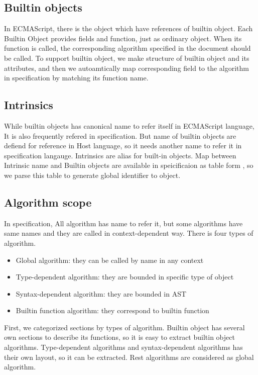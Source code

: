 \subsection{Builtin objects}

 In ECMAScript, there is the object which have references of builtin object. Each Builtin Object provides fields and function, just as ordinary object. When its function is called,
 the corresponding algorithm specified in the document should be called. To support builtin object, we make structure of builtin object and its attributes, and then we autoamtically map corresponding field to the algorithm in specification by matching its function name.
 
 \subsection{Intrinsics}

 While builtin objects has canonical name to refer itself in ECMAScript language, It is also frequently refered in specification. But name of builtin objects
 are defiend for reference in Host language, so it needs another name to refer it in specification langauge. Intrinsics are alias for built-in objects. 
 Map between Intrinsic name and Builtin objects are available in speicificaion as table form , so we parse this table to generate global identifier to object.

 \subsection{Algorithm scope}

 In specification, All algorithm has name to refer it, but some algorithms have same names and they are called in context-dependent way.
 There is four types of algorithm. 
 \begin{itemize}
  \item Global algorithm: they can be called by name in any context
  \item Type-dependent algorithm: they are bounded in specific type of object
  \item Syntax-dependent algorithm: they are bounded in AST
  \item Builtin function algorithm: they correspond to builtin function
  \end{itemize}

  First, we categorized sections by types of algorithm. Builtin object has several own sections to describe its functions,
so it is easy to extract builtin object algorithms. Type-dependent algorithms and syntax-dependent algorithms has their own layout, so it
can be extracted. Rest algorithms are considered as global algorithm.

